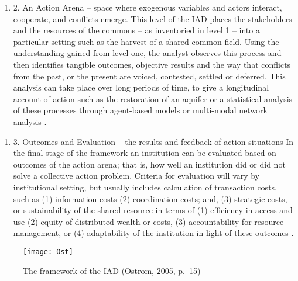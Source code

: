 \begin{enumerate}
\item
2. An Action Arena -- space where exogenous
variables and actors interact, cooperate, and conflicts emerge. This level
of the IAD places the stakeholders and the resources of the commons --
as inventoried in level 1 -- into a particular setting such as the
harvest of a shared common field. Using the understanding gained from
level one, the analyst observes this process and then identifies
tangible outcomes, objective results and the way that conflicts from the
past, or the present are voiced, contested, settled or deferred. This
analysis can take place over long periods of time, to give a
longitudinal account of action such as the restoration of an aquifer
\citep{ostrom2010moving} or a statistical analysis of these processes
through agent-based models or multi-modal network analysis \citep{axelrod1997advancing}.\\
\end{enumerate}
\begin{enumerate}
\item
3. Outcomes and Evaluation -- the results and feedback of action
situations In the final stage of the framework an institution can be
evaluated based on outcomes of the action arena; that is, how well an
institution did or did not solve a collective action problem. Criteria
for evaluation will vary by institutional setting, but usually includes
calculation of transaction costs, such as (1) information costs (2)
coordination costs; and, (3) strategic costs, or
sustainability of the shared resource in terms of (1) efficiency in
access and use (2) equity of distributed wealth or costs, (3)
accountability for resource management, or (4) adaptability of the
institution in light of these outcomes  \citep{imperial2005taking}.\\ 
\end{enumerate}

\begin{figure}
\centering
\texttt{[image: Ost]}
\caption{The framework of the IAD (Ostrom, 2005, p.~15)}
\label{fig:my_label}
\end{figure}

